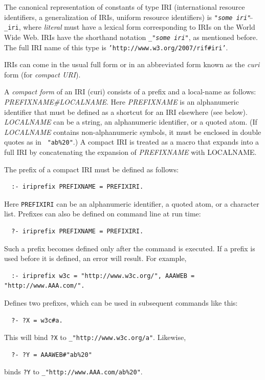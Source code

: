 \documentclass[11pt]{article}
\begin{document}
The canonical representation of constants of type IRI (international
resource identifiers, a generalization of IRIs, uniform resource
identifiers) is
{\tt "\emph{some iri}"$\hat{~}\hat{~}$\_iri}, where \emph{literal} must have
a lexical form corresponding to IRIs on the World Wide Web. IRIs have the shorthand notation
{\tt \_"\emph{some iri}"}, as mentioned before. The full IRI name of this
type is {\tt 'http://www.w3.org/2007/rif\#iri'}. 


IRIs can come in the usual full form or in an abbreviated form
known as the \emph{curi} form (for \emph{compact URI}).  

\index{\#}
A \emph{compact form} of an IRI (curi) consists of a
prefix and a local-name as follows: \emph{PREFIXNAME\#LOCALNAME}. Here
\emph{PREFIXNAME} is an alphanumeric identifier that must be defined as a
shortcut for an IRI elsewhere (see below). \emph{LOCALNAME} can be a string,
an alphanumeric identifier, or a quoted atom. (If \emph{LOCALNAME} contains
non-alphanumeric symbols, it must be enclosed in double quotes as in {\tt
  "ab\%20"}.) A compact IRI is treated as a macro that expands into a full IRI
by concatenating the expansion of \emph{PREFIXNAME}
with LOCALNAME.

The prefix of a compact IRI must be defined as follows:
\begin{verbatim}
  :- iriprefix PREFIXNAME = PREFIXIRI. 
\end{verbatim}
Here {\tt PREFIXIRI}  can be an alphanumeric identifier, a
quoted atom, or a character list. Prefixes can also be defined on
command line at run time:
\begin{verbatim}
  ?- iriprefix PREFIXNAME = PREFIXIRI. 
\end{verbatim}
Such a prefix becomes defined only after the command is executed.
If a prefix is used before it is defined, an error will result.
For example,
\begin{verbatim}
  :- iriprefix w3c = "http://www.w3c.org/", AAAWEB = "http://www.AAA.com/". 
\end{verbatim}
Defines two prefixes, which can be used in subsequent commands like this:
\begin{verbatim}
  ?- ?X = w3c#a.
\end{verbatim}
This will bind {\tt ?X} to   {\tt \_"http://www.w3c.org/a"}. 
Likewise,
\begin{verbatim}
  ?- ?Y = AAAWEB#"ab%20" 
\end{verbatim}
binds {\tt ?Y} to {\tt \_"http://www.AAA.com/ab\%20"}. 
\end{document}
